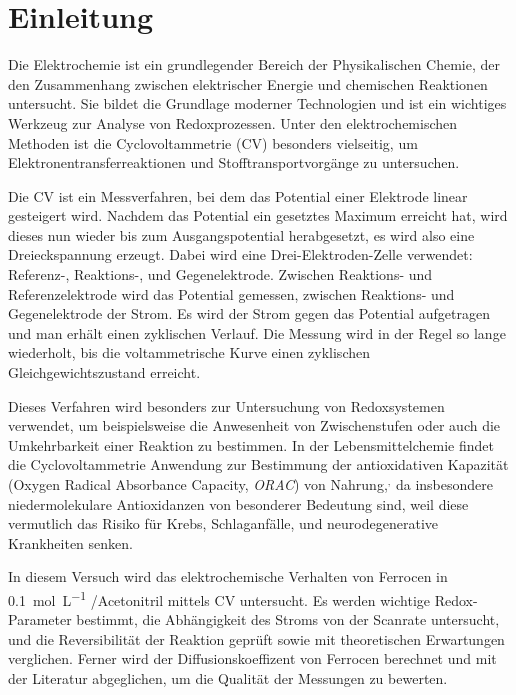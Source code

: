 \section{Einleitung}
Die Elektrochemie ist ein grundlegender Bereich der Physikalischen Chemie, der den Zusammenhang zwischen elektrischer Energie und chemischen Reaktionen untersucht.
Sie bildet die Grundlage moderner Technologien und ist ein wichtiges Werkzeug zur Analyse von Redoxprozessen.
Unter den elektrochemischen Methoden ist die Cyclovoltammetrie (CV) besonders vielseitig, um Elektronentransferreaktionen und Stofftransportvorgänge zu untersuchen.

Die CV ist ein Messverfahren, bei dem das Potential einer Elektrode linear gesteigert wird.
Nachdem das Potential ein gesetztes Maximum erreicht hat, wird dieses nun wieder bis zum Ausgangspotential herabgesetzt, es wird also eine Dreieckspannung erzeugt.
Dabei wird eine Drei-Elektroden-Zelle verwendet: Referenz-, Reaktions-, und Gegenelektrode.
Zwischen Reaktions- und Referenzelektrode wird das Potential gemessen, zwischen Reaktions- und Gegenelektrode der Strom.
Es wird der Strom gegen das Potential aufgetragen und man erhält einen zyklischen Verlauf.
Die Messung wird in der Regel so lange wiederholt, bis die voltammetrische Kurve einen zyklischen Gleichgewichtszustand erreicht.

Dieses Verfahren wird besonders zur Untersuchung von Redoxsystemen verwendet, um beispielsweise die Anwesenheit von Zwischenstufen oder auch die Umkehrbarkeit einer Reaktion zu bestimmen.
In der Lebensmittelchemie findet die Cyclovoltammetrie Anwendung zur Bestimmung der antioxidativen Kapazität (Oxygen Radical Absorbance Capacity, \textit{ORAC}) von Nahrung,\autocite{chevion2000antioxidant}$^, $\autocite{brcanovic2013cyclic}
da insbesondere niedermolekulare Antioxidanzen von besonderer Bedeutung sind, weil diese vermutlich das Risiko für Krebs\autocite{sohal1996oxidative}, Schlaganfälle\autocite{leinonen2000low},
und neurodegenerative Krankheiten\autocite{gilbert2000fifty} senken.

In diesem Versuch wird das elektrochemische Verhalten von Ferrocen in \qty{0.1}{\mol\per\liter} /Acetonitril mittels CV untersucht.
Es werden wichtige Redox-Parameter bestimmt, die Abhängigkeit des Stroms von der Scanrate untersucht, und die Reversibilität der Reaktion geprüft sowie mit theoretischen Erwartungen verglichen.
Ferner wird der Diffusionskoeffizent von Ferrocen berechnet und mit der Literatur abgeglichen, um die Qualität der Messungen zu bewerten.

